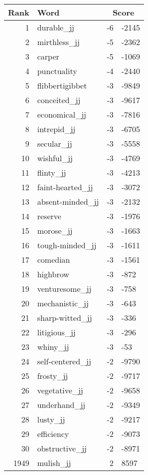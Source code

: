 \begin{longtable}[!htbp]{| rlr@{.}l |}
    \hline
    \textbf{Rank} & \textbf{Word} & \multicolumn{2}{c|}{\textbf{Score}} \\
    \hline
    \endhead
    1 & durable\_jj & -6 & -2145 \\
    2 & mirthless\_jj & -5 & -2362 \\
    3 & carper & -5 & -1069 \\
    4 & punctuality & -4 & -2440 \\
    5 & flibbertigibbet & -3 & -9849 \\
    6 & conceited\_jj & -3 & -9617 \\
    7 & economical\_jj & -3 & -7816 \\
    8 & intrepid\_jj & -3 & -6705 \\
    9 & secular\_jj & -3 & -5558 \\
    10 & wishful\_jj & -3 & -4769 \\
    11 & flinty\_jj & -3 & -4213 \\
    12 & faint-hearted\_jj & -3 & -3072 \\
    13 & absent-minded\_jj & -3 & -2132 \\
    14 & reserve & -3 & -1976 \\
    15 & morose\_jj & -3 & -1663 \\
    16 & tough-minded\_jj & -3 & -1611 \\
    17 & comedian & -3 & -1561 \\
    18 & highbrow & -3 & -872 \\
    19 & venturesome\_jj & -3 & -758 \\
    20 & mechanistic\_jj & -3 & -643 \\
    21 & sharp-witted\_jj & -3 & -336 \\
    22 & litigious\_jj & -3 & -296 \\
    23 & whiny\_jj & -3 & -53 \\
    24 & self-centered\_jj & -2 & -9790 \\
    25 & frosty\_jj & -2 & -9717 \\
    26 & vegetative\_jj & -2 & -9658 \\
    27 & underhand\_jj & -2 & -9349 \\
    28 & lusty\_jj & -2 & -9217 \\
    29 & efficiency & -2 & -9073 \\
    30 & obstructive\_jj & -2 & -8971 \\
    1949 & mulish\_jj & 2 & 8597 \\

\end{longtable}

